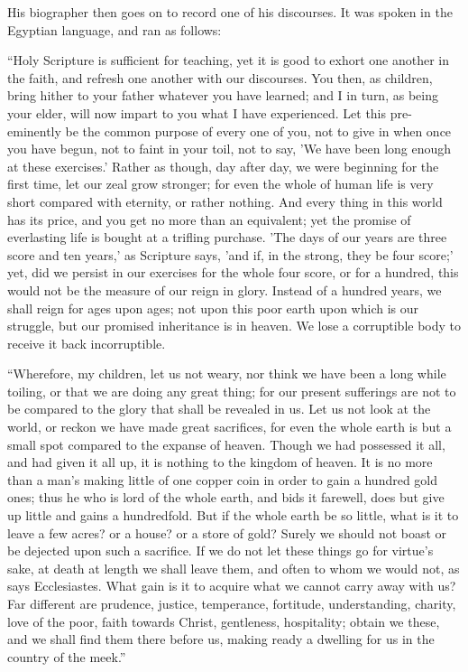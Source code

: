 His biographer then goes on to record one of his discourses. It was
spoken in the Egyptian language, and ran as follows:

``Holy Scripture is sufficient for teaching, yet it is good to
exhort one another in the faith, and refresh one another with our
discourses. You then, as children, bring hither to your father
whatever you have learned; and I in turn, as being your elder, will
now impart to you what I have experienced. Let this pre-eminently be
the common purpose of every one of you, not to give in when once you
have begun, not to faint in your toil, not to say, 'We have been long
enough at these exercises.' Rather as though, day after day, we were
beginning for the first time, let our zeal grow stronger; for even the
whole of human life is very short compared with eternity, or rather
nothing. And every thing in this world has its price, and you get no
more than an equivalent; yet the promise of everlasting life is bought
at a trifling purchase. 'The days of our years are three score and ten
years,' as Scripture says, 'and if, in the strong, they be four
score;' yet, did we persist in our exercises for the whole four score,
or for a hundred, this would not be the measure of our reign in glory.
Instead of a hundred years, we shall reign for ages upon ages; not
upon this poor earth upon which is our struggle, but our promised
inheritance is in heaven. We lose a
corruptible body to receive it back incorruptible.

``Wherefore, my children, let us not weary, nor think we have
been a long while toiling, or that we are doing any great thing; for
our present sufferings are not to be compared to the glory that shall
be revealed in us. Let us not look at the world, or reckon we have
made great sacrifices, for even the whole earth is but a small spot
compared to the expanse of heaven. Though we had possessed it all, and
had given it all up, it is nothing to the kingdom of heaven. It is no
more than a man's making little of one copper coin in order to gain a
hundred gold ones; thus he who is lord of the whole earth, and bids it
farewell, does but give up little and gains a hundredfold. But if the
whole earth be so little, what is it to leave a few acres? or a house?
or a store of gold? Surely we should not boast or be dejected upon
such a sacrifice. If we do not let these things go for virtue's sake,
at death at length we shall leave them, and often to whom we would
not, as says Ecclesiastes. What gain is it to acquire what we cannot
carry away with us? Far different are prudence, justice, temperance,
fortitude, understanding, charity, love of the poor, faith towards
Christ, gentleness, hospitality; obtain we these, and we shall find
them there before us, making ready a dwelling for us in the country of
the meek.''

